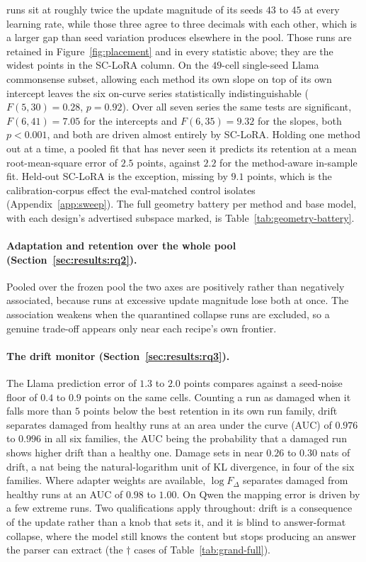 \documentclass[11pt]{article}
\newcommand{\dw}{F_{\Delta}}
\begin{document}
runs sit at roughly twice the update magnitude of its seeds $43$ to $45$
at every learning rate, while those three agree to three decimals with
each other, which is a larger gap than seed variation produces elsewhere
in the pool. Those runs are retained in Figure~\ref{fig:placement} and in
every statistic above; they are the widest points in the SC-LoRA column. On the $49$-cell single-seed Llama
commonsense subset, allowing each method its own slope on top of its own
intercept leaves the six on-curve series statistically indistinguishable
($F(5,30)\!=\!0.28$, $p\!=\!0.92$). Over all seven series the same tests are
significant, $F(6,41)\!=\!7.05$ for the intercepts and $F(6,35)\!=\!9.32$ for
the slopes, both $p<0.001$, and both are driven almost entirely by SC-LoRA.
Holding one method out at a time, a pooled
fit that has never seen it predicts its retention at a mean root-mean-square
error of $2.5$ points, against $2.2$ for the method-aware in-sample fit.
Held-out SC-LoRA is the exception, missing by $9.1$ points, which is the
calibration-corpus effect the eval-matched control isolates
(Appendix~\ref{app:sweep}). The full geometry
battery per method and base model, with each design's advertised subspace
marked, is Table~\ref{tab:geometry-battery}.



\paragraph{Adaptation and retention over the whole pool
(Section~\ref{sec:results:rq2}).} Pooled over the frozen pool the two axes are
positively rather than negatively associated, because runs at excessive update
magnitude lose both at once. The association weakens when the quarantined
collapse runs are excluded, so a genuine trade-off appears only near each
recipe's own frontier.

\paragraph{The drift monitor (Section~\ref{sec:results:rq3}).} The Llama
prediction error of $1.3$ to $2.0$ points compares against a seed-noise floor
of $0.4$ to $0.9$ points on the same cells. Counting a run as damaged when it
falls more than $5$ points below the best retention in its own run family,
drift separates damaged from healthy runs at an area under the curve (AUC) of
$0.976$ to $0.996$ in all six families, the AUC being the probability that a
damaged run shows higher drift than a healthy one. Damage sets in near $0.26$
to $0.30$ nats of drift, a nat being the natural-logarithm unit of KL
divergence, in four of the six families. Where adapter weights are available,
$\log\dw$ separates damaged from healthy runs at an AUC of $0.98$ to $1.00$.
On Qwen the mapping error is driven by a few extreme runs. Two qualifications
apply throughout: drift is a consequence of the update rather than a knob that
sets it, and it is blind to answer-format collapse, where the model still
knows the content but stops producing an answer the parser can extract (the
$\dagger$ cases of Table~\ref{tab:grand-full}).
\end{document}
